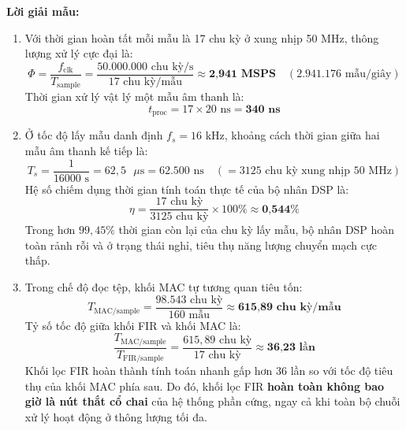 \textbf{Lời giải mẫu:}
\begin{enumerate}[label=(\alph*)]
    \item Với thời gian hoàn tất mỗi mẫu là 17 chu kỳ ở xung nhịp 50 MHz, thông lượng xử lý cực đại là:
    \begin{equation}
    \Phi = \frac{f_{\text{clk}}}{T_{\text{sample}}} = \frac{50.000.000\text{ chu kỳ/s}}{17\text{ chu kỳ/mẫu}} \approx \textbf{2{,}941 MSPS} \quad (2.941.176\text{ mẫu/giây})
    \end{equation}
    Thời gian xử lý vật lý một mẫu âm thanh là:
    \begin{equation}
    t_{\text{proc}} = 17 \times 20\text{ ns} = \textbf{340 ns}
    \end{equation}
    \item Ở tốc độ lấy mẫu danh định $f_s = 16\text{ kHz}$, khoảng cách thời gian giữa hai mẫu âm thanh kế tiếp là:
    \begin{equation}
    T_s = \frac{1}{16000\text{ s}} = 62{,}5\text{ }\mu\text{s} = 62.500\text{ ns} \quad (= 3125\text{ chu kỳ xung nhịp 50 MHz})
    \end{equation}
    Hệ số chiếm dụng thời gian tính toán thực tế của bộ nhân DSP là:
    \begin{equation}
    \eta = \frac{17\text{ chu kỳ}}{3125\text{ chu kỳ}} \times 100\% \approx \textbf{0{,}544\%}
    \end{equation}
    Trong hơn $99{,}45\%$ thời gian còn lại của chu kỳ lấy mẫu, bộ nhân DSP hoàn toàn rảnh rỗi và ở trạng thái nghỉ, tiêu thụ năng lượng chuyển mạch cực thấp.
    \item Trong chế độ đọc tệp, khối MAC tự tương quan tiêu tốn:
    \begin{equation}
    T_{\text{MAC/sample}} = \frac{98.543\text{ chu kỳ}}{160\text{ mẫu}} \approx \textbf{615{,}89 chu kỳ/mẫu}
    \end{equation}
    Tỷ số tốc độ giữa khối FIR và khối MAC là:
    \begin{equation}
    \frac{T_{\text{MAC/sample}}}{T_{\text{FIR/sample}}} = \frac{615{,}89\text{ chu kỳ}}{17\text{ chu kỳ}} \approx \textbf{36{,}23 lần}
    \end{equation}
    Khối lọc FIR hoàn thành tính toán nhanh gấp hơn 36 lần so với tốc độ tiêu thụ của khối MAC phía sau. Do đó, khối lọc FIR \textbf{hoàn toàn không bao giờ là nút thắt cổ chai} của hệ thống phần cứng, ngay cả khi toàn bộ chuỗi xử lý hoạt động ở thông lượng tối đa.
\end{enumerate}

